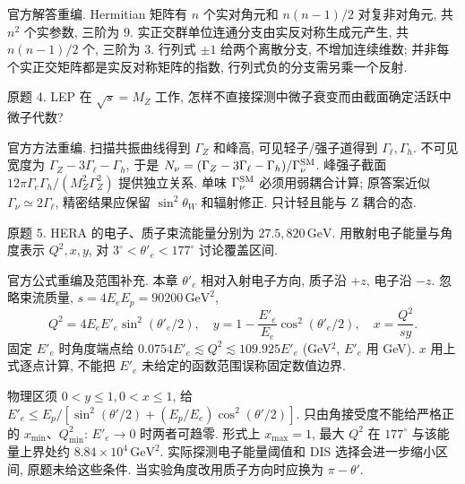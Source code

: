 \begin{solution}
官方解答重编. Hermitian 矩阵有 $n$ 个实对角元和 $n(n-1)/2$ 对复非对角元, 共 $n^2$ 个实参数, 三阶为 $9$. 实正交群单位连通分支由实反对称生成元产生, 共 $n(n-1)/2$ 个, 三阶为 $3$. 行列式 $\pm1$ 给两个离散分支, 不增加连续维数; 并非每个实正交矩阵都是实反对称矩阵的指数, 行列式负的分支需另乘一个反射.
\end{solution}
\begin{exercise}\label{ex:8701-4-4}
原题 4. LEP 在 $\sqrt s=M_Z$ 工作, 怎样不直接探测中微子衰变而由截面确定活跃中微子代数?
\end{exercise}
\begin{solution}
官方方法重编. 扫描共振曲线得到 $\Gamma_Z$ 和峰高, 可见轻子/强子道得到 $\Gamma_\ell,\Gamma_h$. 不可见宽度为 $\Gamma_Z-3\Gamma_\ell-\Gamma_h$, 于是
$N_\nu=(\Gamma_Z-3\Gamma_\ell-\Gamma_h)/\Gamma_\nu^{\rm SM}$.
峰强子截面 $12\pi\Gamma_e\Gamma_h/(M_Z^2\Gamma_Z^2)$ 提供独立关系. 单味 $\Gamma_\nu^{\rm SM}$ 必须用弱耦合计算; 原答案近似 $\Gamma_\nu\simeq2\Gamma_\ell$, 精密结果应保留 $\sin^2\theta_W$ 和辐射修正. 只计轻且能与 Z 耦合的态.
\end{solution}
\begin{exercise}\label{ex:8701-4-5}
原题 5. HERA 的电子、质子束流能量分别为 $27.5,820\,\mathrm{GeV}$. 用散射电子能量与角度表示 $Q^2,x,y$, 对 $3^\circ<\theta'_e<177^\circ$ 讨论覆盖区间.
\end{exercise}
\begin{solution}
官方公式重编及范围补充. 本章 $\theta'_e$ 相对入射电子方向, 质子沿 $+z$, 电子沿 $-z$. 忽略束流质量, $s=4E_eE_p=90200\,\mathrm{GeV}^2$,
\begin{equation}
 Q^2=4E_eE'_e\sin^2(\theta'_e/2),\quad
 y=1-\frac{E'_e}{E_e}\cos^2(\theta'_e/2),\quad x=\frac{Q^2}{sy}.
\end{equation}
固定 $E'_e$ 时角度端点给 $0.0754E'_e\lesssim Q^2\lesssim109.925E'_e$ (GeV$^2$, $E'_e$ 用 GeV). $x$ 用上式逐点计算, 不能把 $E'_e$ 未给定的函数范围误称固定数值边界.

物理区须 $0<y\le1,0<x\le1$, 给
$E'_e\le E_p/[\sin^2(\theta'/2)+(E_p/E_e)\cos^2(\theta'/2)]$.
只由角接受度不能给严格正的 $x_{\min}$、$Q^2_{\min}$: $E'_e\to0$ 时两者可趋零. 形式上 $x_{\max}=1$, 最大 $Q^2$ 在 $177^\circ$ 与该能量上界处约 $8.84\times10^4\,\mathrm{GeV}^2$. 实际探测电子能量阈值和 DIS 选择会进一步缩小区间, 原题未给这些条件. 当实验角度改用质子方向时应换为 $\pi-\theta'$.
\end{solution}
